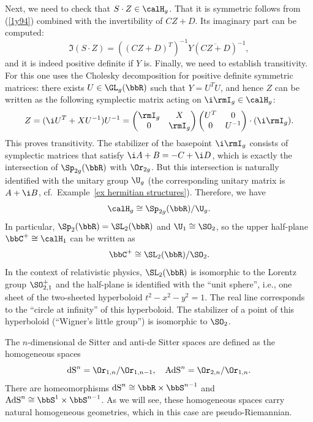 \begin{example}
    Next, we need to check that $S\cdot Z\in \calH_g$. That it is symmetric follows from (\ref{1y94}) combined with the invertibility of $CZ+D$. Its imaginary part can be computed:
    \[\Im (S\cdot Z)=((CZ+D)^T)^{-1}Y(\overline{CZ+D})^{-1},\]
    and it is indeed positive definite if $Y$ is. Finally, we need to establish transitivity. For this one uses the Cholesky decomposition for positive definite symmetric matrices: there exists $U\in\GL_g(\bbR)$ such that $Y=U^TU$, and hence $Z$ can be written as the following symplectic matrix acting on $\i \rmI_g\in \calH_g$:
    \[Z=(\i U^T+XU^{-1})U^{-1}=\begin{pmatrix}
        \rmI_g & X\\
        0 & \rmI_g
    \end{pmatrix}\begin{pmatrix}
        U^T & 0\\
        0 & U^{-1}
    \end{pmatrix}\cdot(\i \rmI_g).\]
    This proves transitivity. The stabilizer of the basepoint $\i \rmI_g$ consists of symplectic matrices that satisfy $\i A+B=-C+\i D$, which is exactly the intersection of $\Sp_{2g}(\bbR)$ with $\Or_{2g}$. But this intersection is naturally identified with the unitary group $\U_g$ (the corresponding unitary matrix is $A+\i B$, cf.\ Example~\ref{ex hermitian structures}). Therefore, we have 
    \[\calH_g \cong \Sp_{2g}(\bbR)\slash \U_g.\]
    In particular, $\Sp_2(\bbR)=\SL_2(\bbR)$ and $\U_1\cong\SO_2$, so the upper half-plane $\bbC^+\cong \calH_1$ can be written as 
    \[\bbC^+\cong\SL_2(\bbR)\slash \SO_2.\]
    In the context of relativistic physics, $\SL_2(\bbR)$ is isomorphic to the Lorentz group $\SO^+_{2,1}$ and the half-plane is identified with the ``unit sphere'', i.e., one sheet of the two-sheeted hyperboloid $t^2-x^2-y^2=1$. The real line corresponds to the ``circle at infinity'' of this hyperboloid. The stabilizer of a point of this hyperboloid (``Wigner's little group'') is isomorphic to $\SO_2$.
\end{example}

\begin{example}\label{ex dS and AdS}
    The $n$-dimensional de Sitter and anti-de Sitter spaces are defined as the homogeneous spaces 
    \[\mathrm{dS}^n=\Or_{1,n}\slash \Or_{1,n-1},\quad \mathrm{AdS}^n=\Or_{2,n}\slash \Or_{1,n}.\]
    There are homeomorphisms $\mathrm{dS}^n\cong \bbR\times\bbS^{n-1}$ and $\mathrm{AdS}^n\cong \bbS^1\times\bbS^{n-1}$. As we will see, these homogeneous spaces carry natural homogeneous geometries, which in this case are pseudo-Riemannian.
\end{example}

